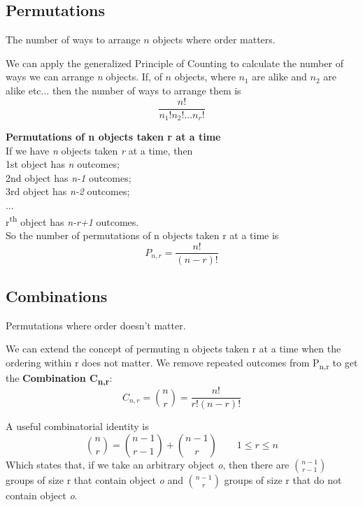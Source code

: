 \documentclass[10pt,a4paper]{article}
\begin{document}
           \subsection{Permutations}
           The number of ways to arrange $n$ objects where order matters.
               \begin{framed}
We can apply the generalized Principle of Counting to calculate the number of ways we can arrange \emph{n} objects. If, of $n$ objects, where $n_1$ are alike and $n_2$ are alike etc... then the number of ways to arrange them is $$ \frac{n!}{n_1!n_2!...n_r!} $$
               \end{framed}
            \begin{framed}
                \center \textbf{Permutations of n objects taken r at a time} \\
                If we have \emph{n} objects taken \emph{r} at a time, then \\
                1st object has \emph{n} outcomes; \\
                2nd object has \emph{n-1} outcomes; \\
                3rd object has \emph{n-2} outcomes; \\               
                ... \\
                r\textsuperscript{th} object has \emph{n-r+1} outcomes. \\
                So the number of permutations of n objects taken r at a time is$$ P_{n,r} = \frac{n!}{(n-r)!} $$
            \end{framed}
            \newpage 
            \subsection{Combinations}
            Permutations where order doesn't matter.
            \begin{framed}
                We can extend the concept of permuting n objects taken r at a time when the ordering within r does not matter. We remove repeated outcomes from P\textsubscript{n,r} to get the \textbf{Combination C\textsubscript{n,r}}: $$C_{n,r} = \binom{n}{r} =  \frac{n!}{r!(n-r)!} $$
            \end{framed}       
           A useful combinatorial identity is $$ \binom{n}{r} = \binom{n-1}{r-1} + \binom{n-1}{r} \qquad 1 \leq r \leq n $$
           Which states that, if we take an arbitrary object \emph{o}, then there are $\binom{n-1}{r-1}$ groups of size r that contain object \emph{o} and $\binom{n-1}{r}$ groups of size r that do not contain object \emph{o}.
           
\end{document}
